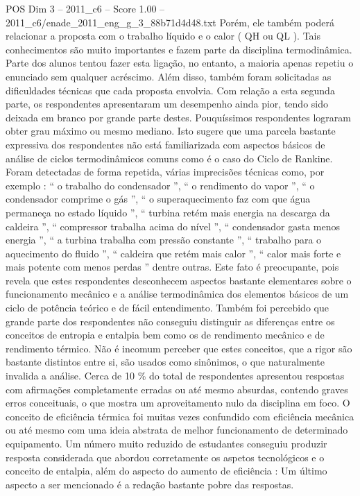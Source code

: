 \begin{textsample}{POS Dim 3 – 2011\_c6 – Score 1.00 – 2011\_c6/enade\_2011\_eng\_g\_3\_88b71d4d48.txt}
Porém, ele também poderá relacionar a proposta com o trabalho líquido e o calor ( QH ou QL ).
Tais conhecimentos são muito importantes e fazem parte da disciplina termodinâmica.
Parte dos alunos tentou fazer esta ligação, no entanto, a maioria apenas repetiu o enunciado sem qualquer acréscimo.
Além disso, também foram solicitadas as dificuldades técnicas que cada proposta envolvia.
Com relação a esta segunda parte, os respondentes apresentaram um desempenho ainda pior, tendo sido deixada em branco por grande parte destes.
Pouquíssimos respondentes lograram obter grau máximo ou mesmo mediano.
Isto sugere que uma parcela bastante expressiva dos respondentes não está familiarizada com aspectos básicos de análise de ciclos termodinâmicos comuns como é o caso do Ciclo de Rankine.
Foram detectadas de forma repetida, várias imprecisões técnicas como, por exemplo : “ o trabalho do condensador ”, “ o rendimento do vapor ”, “ o condensador comprime o gás ”, “ o superaquecimento faz com que água permaneça no estado líquido ”, “ turbina retém mais energia na descarga da caldeira ”, “ compressor trabalha acima do nível ”, “ condensador gasta menos energia ”, “ a turbina trabalha com pressão constante ”, “ trabalho para o aquecimento do fluido ”, “ caldeira que retém mais calor ”, “ calor mais forte e mais potente com menos perdas ” dentre outras.
Este fato é preocupante, pois revela que estes respondentes desconhecem aspectos bastante elementares sobre o funcionamento mecânico e a análise termodinâmica dos elementos básicos de um ciclo de potência teórico e de fácil entendimento.
Também foi percebido que grande parte dos respondentes não conseguiu distinguir as diferenças entre os conceitos de entropia e entalpia bem como os de rendimento mecânico e de rendimento térmico.
Não é incomum perceber que estes conceitos, que a rigor são bastante distintos entre si, são usados como sinônimos, o que naturalmente invalida a análise.
Cerca de 10 \% do total de respondentes apresentou respostas com afirmações completamente erradas ou até mesmo absurdas, contendo graves erros conceituais, o que mostra um aproveitamento nulo da disciplina em foco.
O conceito de eficiência térmica foi muitas vezes confundido com eficiência mecânica ou até mesmo com uma ideia abstrata de melhor funcionamento de determinado equipamento.
Um número muito reduzido de estudantes conseguiu produzir resposta considerada que abordou corretamente os aspetos tecnológicos e o conceito de entalpia, além do aspecto do aumento de eficiência : Um último aspecto a ser mencionado é a redação bastante pobre das respostas.

\end{textsample}
